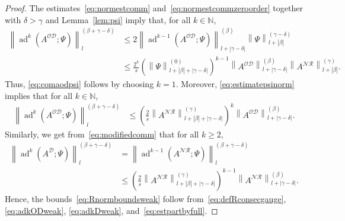 \documentclass[AHL,Unicode,longabstracts,published]{cedram}
\DeclareMathOperator{\ad}{ad}
\newcommand{\N}{\mathbb N}
\newcommand{\CD}{\mathcal{D}}
\newcommand{\CN}{\mathcal{N}}
\newcommand{\CO}{\mathcal{O}}
\newcommand{\CR}{\mathcal{R}}
\newcommand{\COD}{{\CO\CD}}
\newcommand{\CNR}{{\CN\!\CR}}
\newcommand{\resc}{s}
\newcommand{\abs}[1]{\left\lvert #1 \right\rvert}
\newcommand{\snorm}[3]{\left\| #1\right\|_{#3}^{(#2)}}
\begin{document}
\begin{proof}
The estimates~\eqref{eq:normestcomm} and~\eqref{eq:normestcommzeroorder} together with $\delta>\gamma$ and Lemma~\ref{lem:psi} imply that, for all $k\in\N$,
\begin{equation}\label{eq:estmultcomm}
\begin{split}
\snorm{\ad^k\left(A^\COD;\Psi\right)}{\beta+\gamma - \delta}{l} &\le 2
\snorm{\ad^{k-1}\left(A^\COD;\Psi\right)}{\beta}{l + \abs{\gamma - \delta}} \snorm{\Psi}{\gamma - \delta}{l + \abs \beta} \\
&\le \frac{2^{k}}{\resc} \left(\snorm{\Psi}{0}{l + \abs\beta+\abs {\gamma-\delta}}\right)^{k-1} \snorm{A^\COD}{\beta}{l + \abs{\gamma - \delta}}\snorm{A^\CNR}{\gamma}{l + \abs{\beta}}.
\end{split}
\end{equation}
Thus, \eqref{eq:comaodpsi} follows by choosing $k = 1$. Moreover, \eqref{eq:estimatepsinorm} implies that for all $k\in\N$,
\begin{equation}\label{eq:adkODweak}
\begin{split}
\snorm{\ad^k\left(A^\COD;\Psi\right)}{\beta+\gamma - \delta}{l} &\le \left(\frac{2}{\resc}\snorm{A^{\CNR}}{\gamma}{l + \abs\beta+\abs {\gamma-\delta}}\right)^{k} \snorm{A^\COD}{\beta}{l + \abs{\gamma - \delta}}.
\end{split}
\end{equation}
Similarly, we get from~\eqref{eq:modifiedcomm} that for all $k\geq 2$,
\begin{equation}\label{eq:adkDweak}
\begin{split}
\snorm{\ad^k\left(A^\CD;\Psi\right)}{\beta+\gamma - \delta}{l} &=\snorm{\ad^{k-1}\left(A^\CNR;\Psi\right)}{\beta+\gamma - \delta}{l}\\
&\le \left(\frac{2}{\resc}\snorm{A^{\CNR}}{\gamma}{l + \abs\beta+\abs {\gamma-\delta}}\right)^{k-1} \snorm{A^\CNR}{\beta}{l + \abs{\gamma - \delta}}.
\end{split}
\end{equation}
Hence, the bounds~\eqref{eq:Rnormboundsweak} follow from~\eqref{eq:defRconsecgauge}, \eqref{eq:adkODweak}, \eqref{eq:adkDweak}, and~\eqref{eq:estpartbyfull}.
\end{proof}
\end{document}
